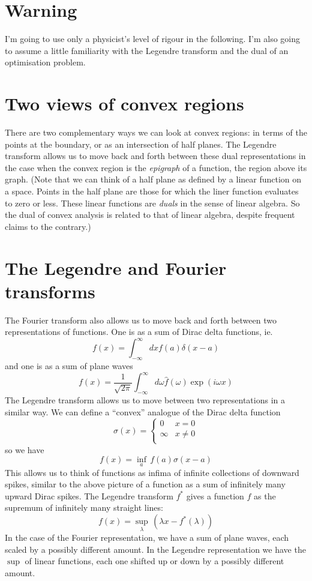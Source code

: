 \documentclass[10pt]{article}
\begin{document}
\section{Warning}
I'm going to use only a physicist's level of rigour in the following.
I'm also going to assume a little familiarity with the Legendre transform and the dual of an optimisation problem.

\section{Two views of convex regions}
There are two complementary ways we can look at convex regions: in terms of the points at the boundary, or as an intersection of half planes.
The Legendre transform allows us to move back and forth between these dual representations in the case when the convex region is the {\it epigraph} of a function, the region above its graph.
(Note that we can think of a half plane as defined by a linear function on a space.
Points in the half plane are those for which the liner function evaluates to zero or less.
These linear functions are {\it duals} in the sense of linear algebra.
So the dual of convex analysis is related to that of linear algebra, despite frequent claims to the contrary.)

\section{The Legendre and Fourier transforms}
The Fourier transform also allows us to move back and forth between two representations of functions.
One is as a sum of Dirac delta functions, ie.
\[
f(x)=\int_{-\infty}^\infty dx f(a)\delta(x-a)
\]
and one is as a sum of plane waves
\[
f(x)=\frac{1}{\sqrt{2\pi}}\int_{-\infty}^\infty d\omega \hat{f}(\omega)\exp(i\omega x)
\]
The Legendre transform allows us to move between two representations in a similar way.
We can define a ``convex'' analogue of the Dirac delta function
\[
\sigma(x)=\begin{cases}
0 & x=0 \\
\infty & x\ne 0 \\
\end{cases}
\]
so we have
\[
f(x) = \inf_a\, f(a)\sigma(x-a)
\]
This allows us to think of functions as infima of infinite collections of downward spikes, similar to the above picture of a function as a sum of infinitely many upward Dirac spikes.
The Legendre transform $f^\ast$ gives a function $f$ as the supremum of infinitely many straight lines:
\[
f(x) = \sup_\lambda\, (\lambda x-f^\ast(\lambda))
\]
In the case of the Fourier representation, we have a sum of plane waves, each scaled by a possibly different amount.
In the Legendre representation we have the $\sup$ of linear functions, each one shifted up or down by a possibly different amount.
\end{document}
